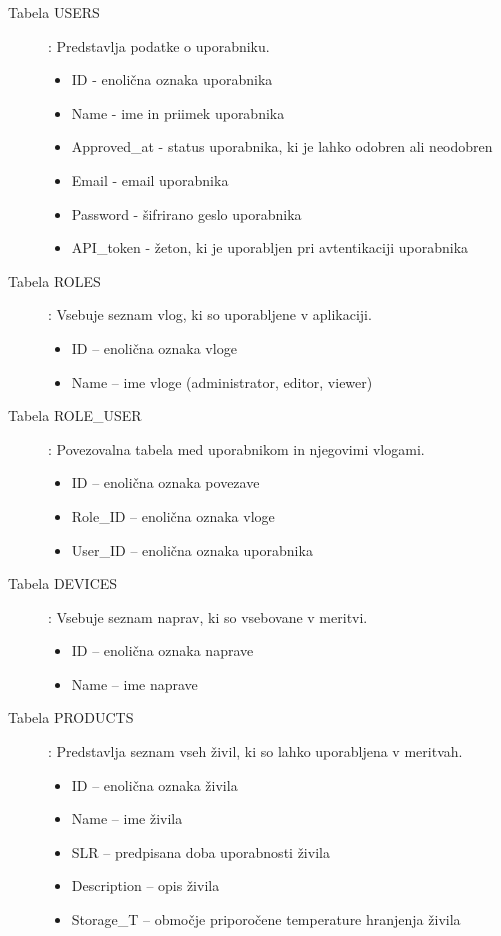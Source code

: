 \documentclass[a4paper, 12pt]{book}
\begin{document}
\begin{description}
\item[Tabela USERS] : Predstavlja podatke o uporabniku.
	\begin{itemize}
		\item ID - enolična oznaka uporabnika
		\item Name - ime in priimek uporabnika
		\item Approved\_at - status uporabnika, ki je lahko odobren ali neodobren
		\item Email - email uporabnika
		\item Password - šifrirano geslo uporabnika
		\item API\_token - žeton, ki je uporabljen pri avtentikaciji uporabnika
	\end{itemize}	

\item[Tabela ROLES] : Vsebuje seznam vlog, ki so uporabljene v aplikaciji.
	\begin{itemize}
		\item ID – enolična oznaka vloge
		\item Name – ime vloge (administrator, editor, viewer)
	\end{itemize}

\item[Tabela ROLE\_USER] : Povezovalna tabela med uporabnikom in njegovimi vlogami. 
	\begin{itemize}
		\item ID – enolična oznaka povezave
		\item Role\_ID – enolična oznaka vloge
		\item User\_ID – enolična oznaka uporabnika
	\end{itemize}

\item[Tabela DEVICES] : Vsebuje seznam naprav, ki so vsebovane v meritvi.
	\begin{itemize}
		\item ID – enolična oznaka naprave
		\item Name – ime naprave
	\end{itemize}

\item[Tabela PRODUCTS] : Predstavlja seznam vseh živil, ki so lahko uporabljena v meritvah.
	\begin{itemize}		
		\item ID – enolična oznaka živila
		\item Name – ime živila
		\item SLR – predpisana doba uporabnosti živila
		\item Description – opis živila
		\item Storage\_T – območje priporočene temperature hranjenja živila
	\end{itemize}
	

\end{description}
\end{document}
